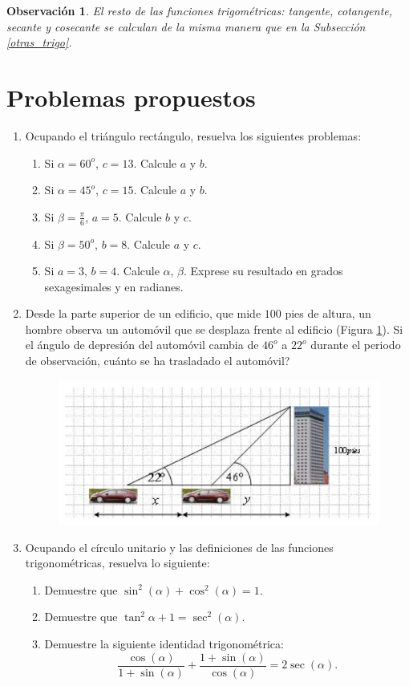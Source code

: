 \documentclass[10pt]{article}
\newcommand{\2}[1]{\hspace{-0.93cm}\colorbox{color1}{\hspace{0.07cm} \parbox{17cm}{\vspace{0.2cm} #1}\hspace*{0.07cm} }}
\newcommand{\3}[1]{\hspace{-0.93cm}\colorbox{color7}{\hspace{0.07cm} \parbox{17cm}{\vspace{0.2cm} #1}\hspace*{0.07cm} }}
\theoremstyle{theorem}
\newtheorem{obser}{Observaci\'on}%
\numberwithin{equation}{section}
\newcommand{\dis}{\displaystyle}
\begin{document}
\begin{obser}
El resto de las funciones trigom\'etricas: tangente, cotangente, secante y cosecante se calculan de la misma manera que en la Subsecci\'on \ref{otras_trigo}.
\end{obser}

\newpage
\section{Problemas propuestos}

\begin{enumerate}
  \item Ocupando el tri\'angulo rect\'angulo, resuelva los siguientes problemas:
     \begin{enumerate}[1.]
         \item Si $\alpha =60^{o}$, $c=13$. Calcule $a$ y $b$.
         \item Si $\alpha =45^{o}$, $c=15$. Calcule $a$ y $b$.
         \item Si $\dis \beta =\frac{\pi}{6}$, $a=5$. Calcule $b$ y $c$.
         \item Si $\beta =50^{o}$, $b=8$. Calcule $a$ y $c$.
         \item Si $a=3$, $b=4$. Calcule $\alpha$, $\beta$. Exprese su resultado en grados sexagesimales y en radianes. 
     \end{enumerate}
  \item Desde la parte superior de un edificio, que mide $100$ pies de altura, un
hombre observa un autom\'ovil que se desplaza frente al edificio (Figura \ref{auto}). Si el \'angulo de
depresi\'on del autom\'ovil cambia de $46^{o}$ a $22^{o}$ durante el periodo de observaci\'on,
cu\'anto se ha trasladado el autom\'ovil?
\begin{figure}[h]\label{auto}
\centering
\includegraphics[scale=0.5]{fig_3}
\end{figure}
  \item Ocupando el c\'irculo unitario y las definiciones de las funciones trigonom\'etricas, resuelva lo siguiente:
\begin{enumerate}[1.]
   \item Demuestre que $\sin^2(\alpha)+\cos^2(\alpha)=1$.
   \item Demuestre que $\tan^2{\alpha}+1=\sec^2(\alpha)$.
   \item Demuestre la siguiente identidad trigonom\'etrica: $$\frac{\cos(\alpha)}{1+\sin(\alpha)}+\frac{1+\sin(\alpha)}{\cos(\alpha)}=2\sec(\alpha).$$
\end{enumerate}




\end{enumerate}
\end{document}
